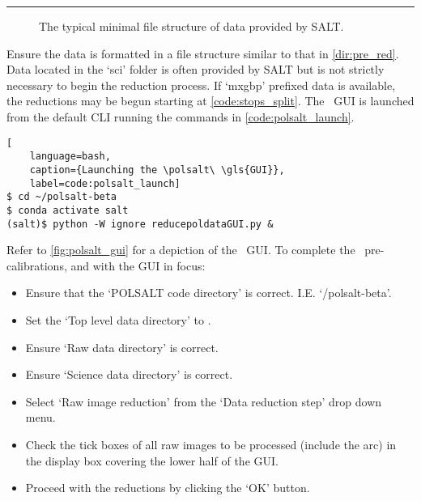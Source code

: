 \vspace{0.5\baselineskip}\hrule

\begin{figure}[h!]
    \centering
    \begin{minipage}{8cm}
    \end{minipage}
    \caption{The typical minimal file structure of data provided by \gls{SALT}.}
    \label{dir:pre_red}
\end{figure}

Ensure the data is formatted in a file structure similar to that in \autoref{dir:pre_red}. Data located in the `sci' folder is often provided by \gls{SALT} but is not strictly necessary to begin the reduction process. If `mxgbp' prefixed data is available, the reductions may be begun starting at \autoref{code:stops_split}. The \polsalt\ \gls{GUI} is launched from the default \gls{CLI} running the commands in \autoref{code:polsalt_launch}.

\begin{lstlisting}[
    language=bash,
    caption={Launching the \polsalt\ \gls{GUI}},
    label=code:polsalt_launch]
$ cd ~/polsalt-beta
$ conda activate salt
(salt)$ python -W ignore reducepoldataGUI.py &
\end{lstlisting}

Refer to \autoref{fig:polsalt_gui} for a depiction of the \polsalt\ \gls{GUI}. To complete the \polsalt\ pre-calibrations, and with the \gls{GUI} in focus:
\begin{itemize}
    \item Ensure that the `POLSALT code directory' is correct. I.E. `\mytilde/polsalt-beta'.
    \item Set the `Top level data directory' to \obsdate.
    \item Ensure `Raw data directory' is correct.
    \item Ensure `Science data directory' is correct.
    \item Select `Raw image reduction' from the `Data reduction step' drop down menu.
    \item Check the tick boxes of all raw images to be processed (include the arc) in the display box covering the lower half of the \gls{GUI}.
    \item Proceed with the reductions by clicking the `OK' button.
\end{itemize}

